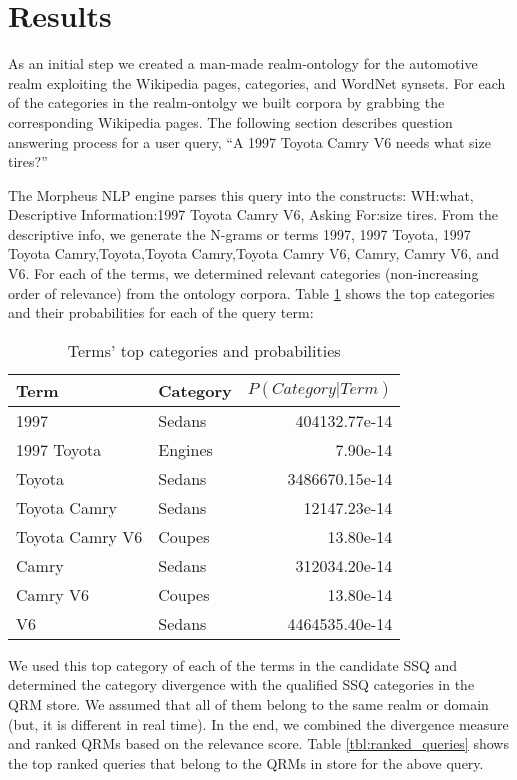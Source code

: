 \section{Results}
\label{sec:results}


As an initial step we created a man-made realm-ontology for the automotive realm
 exploiting the Wikipedia pages, categories, and WordNet synsets. For each of
the categories in the realm-ontolgy we built corpora by grabbing the
corresponding Wikipedia pages. The following section describes question
answering process for a user query, ``A 1997 Toyota Camry V6 needs what size
tires?''

The Morpheus NLP engine parses this query into the constructs: WH:what,
Descriptive Information:1997 Toyota Camry V6, Asking For:size tires. From the
descriptive info, we generate the N-grams or terms 1997, 1997 Toyota, 1997
Toyota Camry,Toyota,Toyota Camry,Toyota Camry V6, Camry, Camry V6, and V6. For
each of the terms, we determined relevant categories (non-increasing order of
relevance) from the ontology corpora. Table \ref{tbl:term_categories} shows
the top categories and their probabilities for each of the query term: 

\begin{table}[h]\footnotesize

\begin{tabular}{l | l | r}
Term & Category & $P(Category|Term)$ \\
\hline
1997 & Sedans & 404132.77e-14\\
1997 Toyota & Engines & 7.90e-14\\
Toyota  & Sedans & 3486670.15e-14\\
Toyota Camry & Sedans & 12147.23e-14\\
Toyota Camry V6 & Coupes & 13.80e-14\\
Camry & Sedans & 312034.20e-14\\
Camry V6 & Coupes & 13.80e-14\\
V6 & Sedans & 4464535.40e-14\\
\hline
\end{tabular}        

\caption{Terms' top categories and probabilities}
\label{tbl:term_categories}   

\end{table}

We used this top category of each of the terms in the candidate SSQ and
determined the category divergence with the qualified SSQ categories in the QRM
store. We assumed that all of them belong to the same realm or domain (but, it
is different in real time). In the end, we combined the divergence measure and
ranked QRMs based on the relevance score. Table \ref{tbl:ranked_queries}
shows the top ranked queries that belong to the QRMs in store for the above
query.

